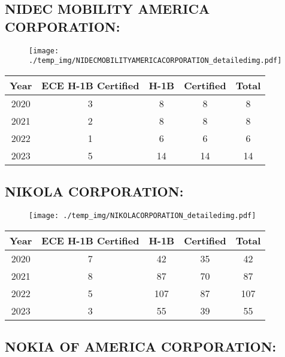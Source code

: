 \documentclass{article}%
\begin{document}
%
\newpage%
\subsection{NIDEC MOBILITY AMERICA CORPORATION:}%
\label{subsec:NIDECMOBILITYAMERICACORPORATION}%
\label{NIDECMOBILITYAMERICACORPORATIONdetailed}%


\begin{figure}[htbp]%
\centering%
\texttt{[image: ./temp\_img/NIDECMOBILITYAMERICACORPORATION\_detailedimg.pdf]}%
\end{figure}

%
\begin{longtable}{c|c|c|c|c}%
\hline%
Year&ECE H{-}1B Certified&H{-}1B&Certified&Total\\%
\hline%
2020&3&8&8&8\\%
\hline%
2021&2&8&8&8\\%
\hline%
2022&1&6&6&6\\%
\hline%
2023&5&14&14&14\\%
\hline%
\end{longtable}

%
\newpage%
\subsection{NIKOLA CORPORATION:}%
\label{subsec:NIKOLACORPORATION}%
\label{NIKOLACORPORATIONdetailed}%


\begin{figure}[htbp]%
\centering%
\texttt{[image: ./temp\_img/NIKOLACORPORATION\_detailedimg.pdf]}%
\end{figure}

%
\begin{longtable}{c|c|c|c|c}%
\hline%
Year&ECE H{-}1B Certified&H{-}1B&Certified&Total\\%
\hline%
2020&7&42&35&42\\%
\hline%
2021&8&87&70&87\\%
\hline%
2022&5&107&87&107\\%
\hline%
2023&3&55&39&55\\%
\hline%
\end{longtable}

%
\newpage%
\subsection{NOKIA OF AMERICA CORPORATION:}%
\label{subsec:NOKIAOFAMERICACORPORATION}%
\label{NOKIAOFAMERICACORPORATIONdetailed}%
\end{document}
